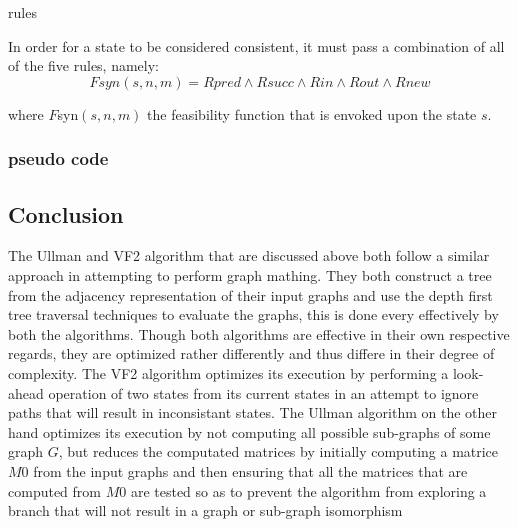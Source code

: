 {rules}

 In order for a state to be considered consistent, it must pass a combination of all of the five rules, namely:
	\begin{equation}
		Fsyn(s,n,m) = Rpred \wedge Rsucc \wedge Rin \wedge Rout \wedge Rnew 
	\end{equation} 

where $F${\tiny syn}$(s,n,m)$ the feasibility function that is envoked upon the state $s$.

\subsubsection{pseudo code}

 \subsection{Conclusion}

 The Ullman and VF2 algorithm that are discussed above both follow a similar approach in attempting to perform graph mathing. They both construct a tree from the adjacency representation of their input graphs and use the depth first tree traversal techniques to evaluate the graphs, this is done every effectively by both the algorithms.\newline\newline
 Though both algorithms are effective in their own respective regards, they are optimized rather differently and thus differe in their degree of complexity. The VF2 algorithm optimizes its execution by performing a look-ahead operation of two states from its current states in an attempt to ignore paths that will result in inconsistant states.\newline\newline
 The Ullman algorithm on the other hand optimizes its execution by not computing all possible sub-graphs of some graph $G$, but reduces the computated matrices by initially computing a matrice $M0$ from the input graphs and then ensuring that all the matrices that are computed from $M0$ are tested so as to prevent the algorithm from exploring a branch that will not result in a graph or sub-graph isomorphism
\newpage

